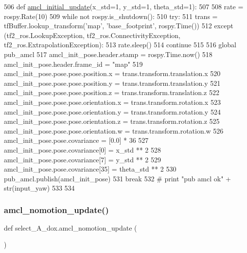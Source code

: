 \begin{DoxyCode}
506 \textcolor{keyword}{def }\hyperlink{namespaceselect___a__dox_aaae6f4a3d568931c6038b1e3cbfb6f9a}{amcl\_initial\_update}(x\_std=1, y\_std=1, theta\_std=1):
507 
508     rate = rospy.Rate(10)
509     \textcolor{keywordflow}{while} \textcolor{keywordflow}{not} rospy.is\_shutdown():
510         \textcolor{keywordflow}{try}:
511             trans = tfBuffer.lookup\_transform(\textcolor{stringliteral}{'map'}, \textcolor{stringliteral}{'base\_footprint'}, rospy.Time())
512         \textcolor{keywordflow}{except} (tf2\_ros.LookupException, tf2\_ros.ConnectivityException, tf2\_ros.ExtrapolationException):
513             rate.sleep()
514             \textcolor{keywordflow}{continue}
515 
516         \textcolor{keyword}{global} pub\_amcl
517         amcl\_init\_pose.header.stamp = rospy.Time.now()
518         amcl\_init\_pose.header.frame\_id = \textcolor{stringliteral}{"map"}
519         amcl\_init\_pose.pose.pose.position.x = trans.transform.translation.x
520         amcl\_init\_pose.pose.pose.position.y = trans.transform.translation.y
521         amcl\_init\_pose.pose.pose.position.z = trans.transform.translation.z
522         amcl\_init\_pose.pose.pose.orientation.x = trans.transform.rotation.x
523         amcl\_init\_pose.pose.pose.orientation.y = trans.transform.rotation.y
524         amcl\_init\_pose.pose.pose.orientation.z = trans.transform.rotation.z
525         amcl\_init\_pose.pose.pose.orientation.w = trans.transform.rotation.w
526         amcl\_init\_pose.pose.covariance = [0.0] * 36
527         amcl\_init\_pose.pose.covariance[0] = x\_std ** 2
528         amcl\_init\_pose.pose.covariance[7] = y\_std ** 2
529         amcl\_init\_pose.pose.covariance[35] = theta\_std ** 2
530         pub\_amcl.publish(amcl\_init\_pose)
531         \textcolor{keywordflow}{break}
532         \textcolor{comment}{# print "pub amcl ok" + str(input\_yaw)}
533 
534 
\end{DoxyCode}
\mbox{\label{namespaceselect___a__dox_a1c4df087055bbe2cb5ce63c92a51d493}} 
\subsubsection{\texorpdfstring{amcl\+\_\+nomotion\+\_\+update()}{amcl\_nomotion\_update()}}
{\footnotesize\ttfamily def select\+\_\+\+A\+\_\+dox.\+amcl\+\_\+nomotion\+\_\+update (\begin{DoxyParamCaption}{ }\end{DoxyParamCaption})}



